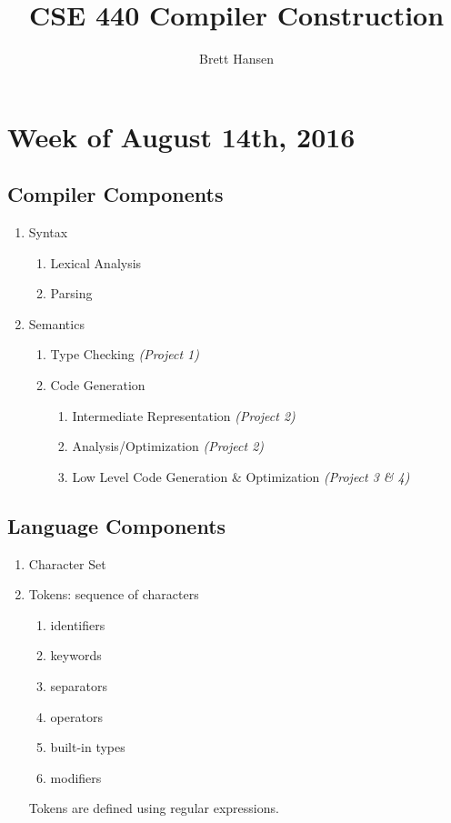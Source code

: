 \documentclass{article}
\title{CSE 440 Compiler Construction}
\author{Brett Hansen}
\date{}
\begin{document}
\maketitle
\tableofcontents
\break

\section{Week of August 14th, 2016}
\subsection{Compiler Components}

\begin{enumerate}
	\item Syntax
	\begin{enumerate}
		\item Lexical Analysis
		\item Parsing
	\end{enumerate}
	\item Semantics
	\begin{enumerate}
		\item Type Checking \textit{(Project 1)}
		\item Code Generation
		\begin{enumerate}
			\item Intermediate Representation \textit{(Project 2)}
			\item Analysis/Optimization \textit{(Project 2)}
			\item Low Level Code Generation \& Optimization \textit{(Project 3 \& 4)}
		\end{enumerate}
	\end{enumerate}
\end{enumerate}

\subsection{Language Components}

\begin{enumerate}
	\item Character Set
	\item Tokens: sequence of characters
	\begin{enumerate}
		\item identifiers
		\item keywords
		\item separators
		\item operators
		\item built-in types
		\item modifiers
	\end{enumerate}
	Tokens are defined using regular expressions.
\end{enumerate}
\end{document}
